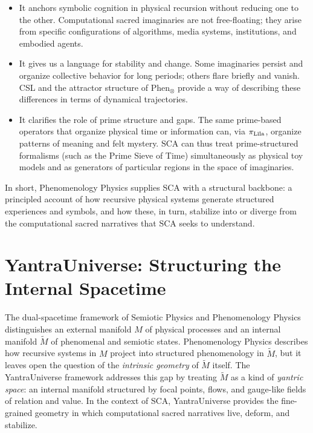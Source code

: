 \documentclass[12]{amsart}
\theoremstyle{plain}
\begin{document}
\begin{itemize}
  \item It anchors symbolic cognition in physical recursion without reducing one to the other. Computational sacred imaginaries are not free-floating; they arise from specific configurations of algorithms, media systems, institutions, and embodied agents.
  \item It gives us a language for stability and change. Some imaginaries persist and organize collective behavior for long periods; others flare briefly and vanish. CSL and the attractor structure of $\text{Phen}_\otimes$ provide a way of describing these differences in terms of dynamical trajectories.
  \item It clarifies the role of prime structure and gaps. The same prime-based operators that organize physical time or information can, via $\pi_{\text{L\={\i}la}}$, organize patterns of meaning and felt mystery. SCA can thus treat prime-structured formalisms (such as the Prime Sieve of Time) simultaneously as physical toy models and as generators of particular regions in the space of imaginaries.
\end{itemize}

In short, Phenomenology Physics supplies SCA with a structural backbone: a principled account of how recursive physical systems generate structured experiences and symbols, and how these, in turn, stabilize into or diverge from the computational sacred narratives that SCA seeks to understand.

\section{YantraUniverse: Structuring the Internal Spacetime}

The dual-spacetime framework of Semiotic Physics and Phenomenology Physics distinguishes an external manifold $M$ of physical processes and an internal manifold $\tilde M$ of phenomenal and semiotic states. Phenomenology Physics describes how recursive systems in $M$ project into structured phenomenology in $\tilde M$, but it leaves open the question of the \emph{intrinsic geometry} of $\tilde M$ itself. The YantraUniverse framework addresses this gap by treating $\tilde M$ as a kind of \emph{yantric space}: an internal manifold structured by focal points, flows, and gauge-like fields of relation and value. In the context of SCA, YantraUniverse provides the fine-grained geometry in which computational sacred narratives live, deform, and stabilize.
\end{document}
